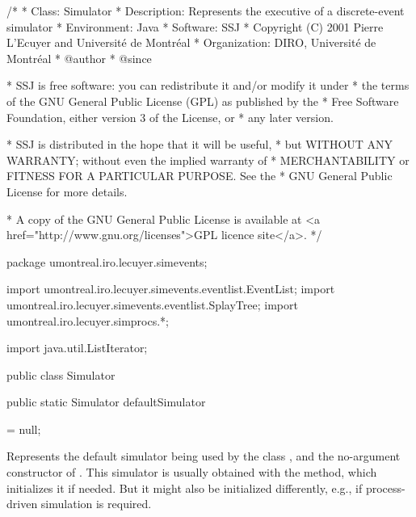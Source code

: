 \begin{code}
\begin{hide}
/*
 * Class:        Simulator
 * Description:  Represents the executive of a discrete-event simulator
 * Environment:  Java
 * Software:     SSJ 
 * Copyright (C) 2001  Pierre L'Ecuyer and Université de Montréal
 * Organization: DIRO, Université de Montréal
 * @author       
 * @since

 * SSJ is free software: you can redistribute it and/or modify it under
 * the terms of the GNU General Public License (GPL) as published by the
 * Free Software Foundation, either version 3 of the License, or
 * any later version.

 * SSJ is distributed in the hope that it will be useful,
 * but WITHOUT ANY WARRANTY; without even the implied warranty of
 * MERCHANTABILITY or FITNESS FOR A PARTICULAR PURPOSE.  See the
 * GNU General Public License for more details.

 * A copy of the GNU General Public License is available at
   <a href="http://www.gnu.org/licenses">GPL licence site</a>.
 */
\end{hide}
package umontreal.iro.lecuyer.simevents;\begin{hide}

import umontreal.iro.lecuyer.simevents.eventlist.EventList;
import umontreal.iro.lecuyer.simevents.eventlist.SplayTree;
import umontreal.iro.lecuyer.simprocs.*;\end{hide}
   import java.util.ListIterator;

public class Simulator \begin{hide} {

   protected double currentTime = 0.0;
      // The current simulation time (clock).

   protected EventList eventList;
      // The list of future events.
      // Can be changed by the method \texttt{init}.

   protected boolean stopped = true;
      // Becomes true when the simulation has ended
      // (stopped has been called or the event list is empty).
      
   protected boolean simulating = false;
   
   protected ContinuousState continuousState = null; \end{hide}
   
   public static Simulator defaultSimulator\begin{hide} = null;\end{hide}
\end{code}
   \begin{tabb} Represents the default simulator being used by the
     class , and the no-argument constructor of .
     This simulator is usually obtained with the
      method, which initializes it if needed.
     But it might also be initialized
     differently, e.g., if process-driven simulation is required.
   \end{tabb}
